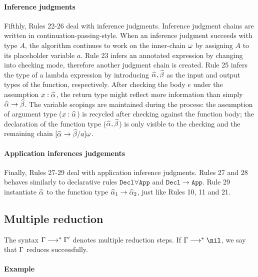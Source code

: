 \paragraph{Inference judgments}
Fifthly, Rules 22-26 deal with inference judgments.
Inference judgment chains are written in continuation-passing-style.
When an inference judgment succeeds with type $A$,
the algorithm continues to work on the inner-chain $\omega$ by assigning $A$ to its placeholder variable $a$.
Rule 23 infers an annotated expression by changing into checking mode,
therefore another judgment chain is created.
Rule 25 infers the type of a lambda expression by introducing $\al, \bt$
as the input and output types of the function, respectively.
After checking the body $e$ under the assumption $x:\al$,
the return type might reflect more information than simply $\al \to \bt$.
The variable scopings are maintained during the process:
the assumption of argument type ($x:\al$) is recycled after checking against the function body;
the declaration of the function type ($\al,\bt$) is only visible to
the checking and the remaining chain $[\al\to\bt/a]\jg$.

\paragraph{Application inferences judgements}
Finally, Rules 27-29 deal with application inference judgments.
Rules 27 and 28 behaves similarly to declarative rules $\mathtt{Decl\forall App}$ and $\mathtt{Decl\to App}$.
Rule 29 instantiate $\al$ to the function type $\al[1] \to \al[2]$, just like Rules 10, 11 and 21.

\subsection{Multiple reduction}
The syntax $\Gamma\longrightarrow^* \Gamma'$ denotes multiple reduction steps.
If $\Gm\redto\nil$, we say that $\Gamma$ reduces successfully.

\paragraph{Example}

